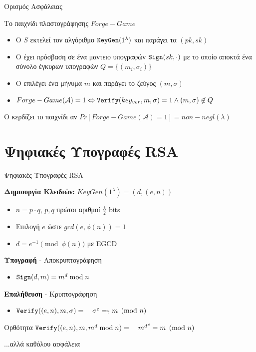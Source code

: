 \documentclass[handout]{beamer}
\begin{document}
\begin{frame}{Ορισμός Ασφάλειας}
\begin{block}{Το παιχνίδι πλαστογράφησης $Forge-Game$}
\begin{itemize}
\item Ο $S$ εκτελεί τον αλγόριθμο $\mathtt{KeyGen}(1^\lambda)$ και παράγει τα $(pk,sk)$
\pause
\item Ο \adv έχει πρόσβαση σε ένα μαντειο υπογραφών $\mathtt{Sign}(sk,\cdot)$ με το οποίο αποκτά ένα σύνολο έγκυρων υπογραφών $Q = \{(m_i, \sigma_i)\}$ \\
\pause
{}
\pause
\item O \adv επιλέγει ένα μήνυμα $m$ και παράγει το ζεύγος $(m, \sigma)$ 
\pause
\item $Forge-Game(\mathcal{A}) = 1 \Leftrightarrow \mathtt{Verify}(key_{ver}, m, \sigma)=1 \wedge (m, \sigma) \not \in Q$
\end{itemize}
\end{block}
\pause
O \adv κερδίζει το παιχνίδι αν $Pr[Forge-Game(\mathcal{A})=1] = non-negl(\lambda)$
\end{frame}

\section{Ψηφιακές Υπογραφές RSA}
\begin{frame} {Ψηφιακές Υπογραφές RSA}
 
\textbf{Δημιουργία Κλειδιών:}
$KeyGen(1^{\lambda}) = (d,(e,n))$
\begin{itemize}
\item $n=p \cdot q$, $p,q$ πρώτοι αριθμοί $\frac{\lambda}{2}$ bits
\item Επιλογή $e$ ώστε $gcd(e,\phi(n))=1$
\item $d = e^{-1} \pmod{\phi(n)}$ με EGCD
\end{itemize}
\pause
\textbf{Υπογραφή} - Αποκρυπτογράφηση
\begin{itemize}
\item $\mathtt{Sign}(d, m) = m^d \bmod n$
\end{itemize}
\pause
\textbf{Επαλήθευση} - Κρυπτογράφηση
\begin{itemize}
\item $\verify((e,n), m, \sigma) = \ \ \ \sigma^e =_? m \pmod{n}$
\end{itemize} 
\pause
\begin{block}{Ορθότητα}
$\mathtt{Verify}((e,n), m, m^d \bmod{n})= \ \ \  {m^d}^e = m \pmod{n}$
\end{block}
\pause
\alert{...αλλά καθόλου ασφάλεια}
\end{frame}
\end{document}
